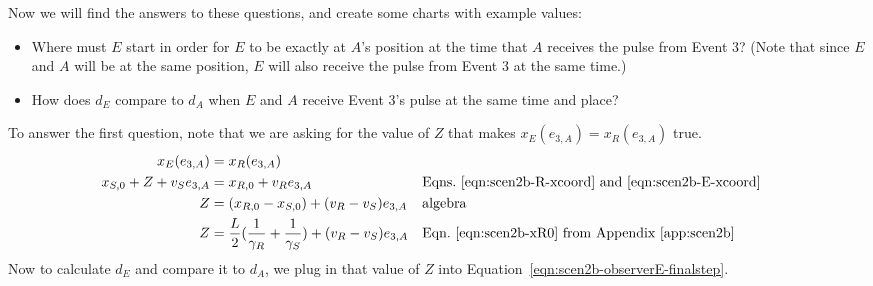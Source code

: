 \documentclass[a4paper]{article}
\theoremstyle{plain}
\theoremstyle{definition}
\begin{document}
Now we will find the answers to these questions, and create some
charts with example values:
\begin{itemize}
\item Where must $E$ start in order for $E$ to be exactly at $A$'s
  position at the time that $A$ receives the pulse from Event 3?
  (Note that since $E$ and $A$ will be at the same position, $E$ will
  also receive the pulse from Event 3 at the same time.)
\item How does $d_E$ compare to $d_A$ when $E$ and $A$ receive Event
  3's pulse at the same time and place?
\end{itemize}

To answer the first question, note that we are asking for the value of
$Z$ that makes $x_E(e_{3,A}) = x_R(e_{3,A})$ true.
\begin{align}
x_E(e_{3,A}) & = x_R(e_{3,A}) \nonumber \\
x_{S,0} + Z + v_S e_{3,A} & = x_{R,0} + v_R e_{3,A} & & \text{Eqns.~\eqref{eqn:scen2b-R-xcoord} and~\eqref{eqn:scen2b-E-xcoord}} \nonumber \\
Z & = (x_{R,0} - x_{S,0}) + (v_R - v_S) e_{3,A} & & \text{algebra} \nonumber \\
Z & = \frac{L}{2} ( \frac{1}{\gamma_R} + \frac{1}{\gamma_S} ) + (v_R - v_S) e_{3,A} & & \text{Eqn.~\eqref{eqn:scen2b-xR0} from Appendix~\ref{app:scen2b}} \label{eqn:scen2b-Z-where-E-A-rcv-pulse-simultaneously}
\end{align}
Now to calculate $d_E$ and compare it to $d_A$, we plug in that value
of $Z$ into Equation~\eqref{eqn:scen2b-observerE-finalstep}.
\end{document}
